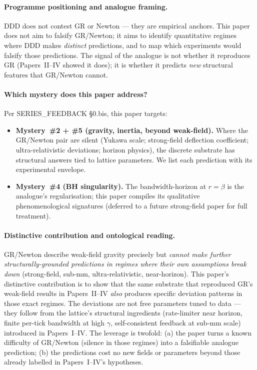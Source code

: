 \documentclass[11pt,a4paper]{article}
\begin{document}
\paragraph{Programme positioning and analogue framing.}
DDD does not contest GR or Newton — they are empirical anchors. This paper does not aim to falsify GR/Newton; it aims to identify quantitative regimes where DDD makes \emph{distinct} predictions, and to map which experiments would falsify those predictions. The signal of the analogue is not whether it reproduces GR (Papers~II--IV showed it does); it is whether it predicts \emph{new} structural features that GR/Newton cannot.


\paragraph{Which mystery does this paper address?}
Per SERIES\_FEEDBACK §0.bis, this paper targets:

\begin{itemize}
\item \textbf{Mystery~\#2 + \#5 (gravity, inertia, beyond weak-field).} Where the GR/Newton pair are silent (Yukawa scale; strong-field deflection coefficient; ultra-relativistic deviations; horizon physics), the discrete substrate has structural answers tied to lattice parameters. We list each prediction with its experimental envelope.
\item \textbf{Mystery~\#4 (BH singularity).} The bandwidth-horizon at $r = \beta$ is the analogue's regularisation; this paper compiles its qualitative phenomenological signatures (deferred to a future strong-field paper for full treatment).
\end{itemize}


\paragraph{Distinctive contribution and ontological reading.}
GR/Newton describe weak-field gravity precisely but \emph{cannot make further structurally-grounded predictions in regimes where their own assumptions break down} (strong-field, sub-mm, ultra-relativistic, near-horizon). This paper's distinctive contribution is to show that the same substrate that reproduced GR's weak-field results in Papers~II--IV \emph{also} produces specific deviation patterns in those exact regimes. The deviations are not free parameters tuned to data --- they follow from the lattice's structural ingredients (rate-limiter near horizon, finite per-tick bandwidth at high $\gamma$, self-consistent feedback at sub-mm scale) introduced in Papers~I--IV. The leverage is twofold: (a) the paper turns a known difficulty of GR/Newton (silence in those regimes) into a falsifiable analogue prediction; (b) the predictions cost no new fields or parameters beyond those already labelled in Papers~I--IV's hypotheses.
\end{document}

